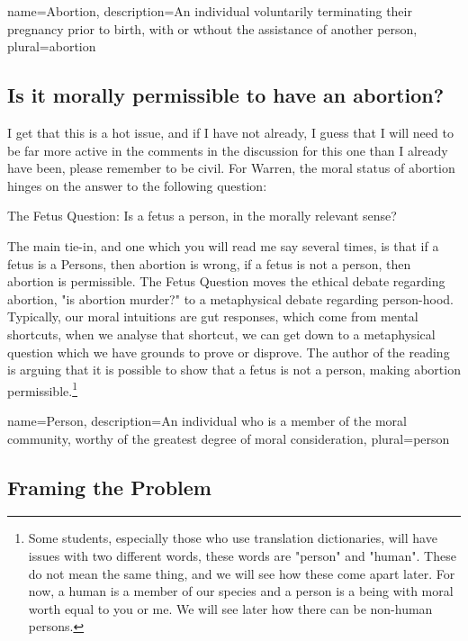 {
  name=Abortion,
  description={An individual voluntarily terminating their pregnancy prior to birth, with or wthout the assistance of another person},
  plural=abortion
}


\subsection{Is it morally permissible to have an abortion?}

I get that this is a hot issue, and if I have not already, I guess that I will need to be far more active in the comments in the discussion for this one than I already have been, please remember to be civil. For Warren, the moral status of abortion hinges on the answer to the following question:

\begin{center}
The Fetus Question: Is a fetus a person, in the morally relevant sense?
\end{center}

The main tie-in, and one which you will read me say several times, is that if a fetus is a \glspl{Person}, then abortion is wrong, if a fetus is not a person, then abortion is permissible. The Fetus Question moves the ethical debate regarding abortion, "is abortion murder?" to a metaphysical debate regarding person-hood. Typically, our moral intuitions are gut responses, which come from mental shortcuts, when we analyse that shortcut, we can get down to a metaphysical question which we have grounds to prove or disprove. The author of the reading is arguing that it is possible to show that a fetus is not a person, making abortion permissible.\footnote{Some students, especially those who use translation dictionaries, will have issues with two different words, these words are "person" and "human". These do not mean the same thing, and we will see how these come apart later. For now, a human is a member of our species and a person is a being with moral worth equal to you or me. We will see later how there can be non-human persons.} 

{
  name=Person,
  description={An individual who is a member of the moral community, worthy of the greatest degree of moral consideration},
  plural=person
}


\subsection{Framing the Problem}

